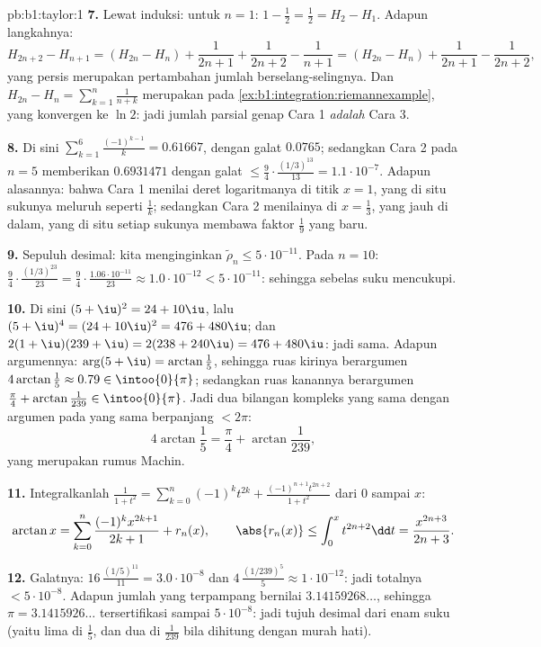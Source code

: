 \begin{solution}{pb:b1:taylor:1}
\textbf{7.} Lewat induksi: untuk $n = 1$: $1 - \frac12 = \frac12 = H_2
- H_1$. Adapun langkahnya:
\[
H_{2n+2} - H_{n+1} = (H_{2n} - H_n) + \frac{1}{2n+1} +
\frac{1}{2n+2} - \frac{1}{n+1}
= (H_{2n} - H_n) + \frac{1}{2n+1} - \frac{1}{2n+2},
\]
yang persis merupakan pertambahan jumlah berselang-selingnya. Dan
$H_{2n} - H_n = \sum_{k=1}^{n}\frac{1}{n+k}$ merupakan 
pada \cref{ex:b1:integration:riemannexample}, yang konvergen ke $\ln
2$: jadi jumlah parsial genap Cara 1 \emph{adalah} 
Cara 3.

\textbf{8.} Di sini $\sum_{k=1}^{6}\frac{(-1)^{k-1}}{k} = 0.61667$,
dengan galat $0.0765$; sedangkan Cara 2 pada $n = 5$ memberikan $0.6931471$ dengan galat
$\leq \frac94\cdot\frac{(1/3)^{13}}{13} = 1.1\cdot10^{-7}$. Adapun
alasannya: bahwa Cara 1 menilai deret logaritmanya di titik
 $x = 1$, yang di situ sukunya meluruh seperti $\frac1k$; sedangkan Cara 2
menilainya di $x = \frac13$, yang jauh di dalam, yang di situ setiap sukunya membawa
faktor $\frac19$ yang baru.

\textbf{9.} Sepuluh desimal: kita menginginkan $\tilde\rho_n \leq
5\cdot10^{-11}$. Pada $n = 10$: $\frac94 \cdot
\frac{(1/3)^{23}}{23} = \frac94\cdot\frac{1.06\cdot10^{-11}}{23}
\approx 1.0\cdot10^{-12} < 5\cdot10^{-11}$: sehingga sebelas suku
mencukupi.

\textbf{10.} Di sini $(5+\iu)^2 = 24 + 10\iu$, lalu $(5+\iu)^4 = (24 +
10\iu)^2 = 476 + 480\iu$; dan $2(1+\iu)(239+\iu) = 2(238 +
240\iu) = 476 + 480\iu$: jadi sama. Adapun argumennya: $\arg(5 + \iu) =
\arctan\frac15$, sehingga ruas kirinya berargumen
$4\arctan\frac15 \approx 0.79 \in \intoo{0}{\pi}$; sedangkan ruas
kanannya berargumen $\frac\pi4 + \arctan\frac{1}{239} \in
\intoo{0}{\pi}$. Jadi dua bilangan kompleks yang sama dengan argumen pada
 yang sama berpanjang $< 2\pi$:
\[
4\arctan\frac15 = \frac\pi4 + \arctan\frac{1}{239} ,
\]
yang merupakan rumus Machin.

\textbf{11.} Integralkanlah $\frac{1}{1+t^2} = \sum_{k=0}^n (-1)^k
t^{2k} + \frac{(-1)^{n+1}t^{2n+2}}{1+t^2}$ dari $0$ sampai $x$:
\[
\arctan x = \sum_{k=0}^{n}\frac{(-1)^k x^{2k+1}}{2k+1} +
r_n(x),
\qquad
\abs{r_n(x)} \leq \int_0^x t^{2n+2}\dd t =
\frac{x^{2n+3}}{2n+3} .
\]

\textbf{12.} Galatnya: $16\,\frac{(1/5)^{11}}{11} = 3.0\cdot
10^{-8}$ dan $4\,\frac{(1/239)^5}{5} \approx 1\cdot10^{-12}$:
jadi totalnya $< 5\cdot10^{-8}$. Adapun jumlah yang terpampang bernilai
$3.14159268\dots$, sehingga $\pi = 3.1415926\dots$ tersertifikasi sampai
$5\cdot10^{-8}$: jadi tujuh desimal dari enam suku (yaitu lima di
$\frac15$, dan dua di $\frac1{239}$ bila dihitung dengan murah hati).


\end{solution}
